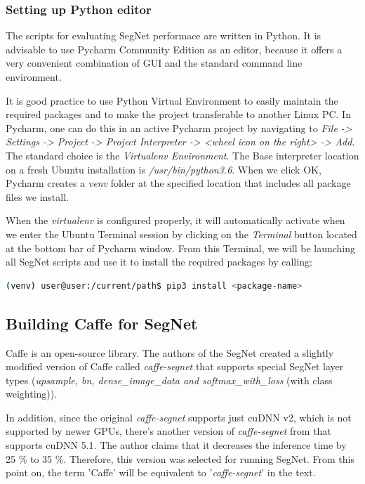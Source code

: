 \subsubsection{Setting up Python editor}

The scripts for evaluating SegNet performace are written in Python. It is advisable to use Pycharm Community Edition as an editor, because it offers a very convenient combination of GUI and the standard command line environment.

It is good practice to use Python Virtual Environment to easily maintain the required packages and to make the project transferable to another Linux PC. In Pycharm, one can do this in an active Pycharm project by navigating to \textit{File -> Settings -> Project -> Project Interpreter -> <wheel icon on the right> -> Add}. The standard choice is the \textit{Virtualenv Environment}. The Base interpreter location on a fresh Ubuntu installation is \textit{/usr/bin/python3.6}. When we click OK, Pycharm creates a \textit{venv} folder at the specified location that includes all package files we install.

When the \textit{virtualenv} is configured properly, it will automatically activate when we enter the Ubuntu Terminal session by clicking on the \textit{Terminal} button located at the bottom bar of Pycharm window. From this Terminal, we will be launching all SegNet scripts and use it to install the required packages by calling:

\begin{lstlisting}[language=bash]
(venv) user@user:/current/path$ pip3 install <package-name>
\end{lstlisting}

\subsection{Building Caffe for SegNet} 

Caffe is an open-source library. The authors of the SegNet created a slightly modified version of Caffe called \textit{caffe-segnet} that supports special SegNet layer types (\textit{upsample, bn, dense\_image\_data and softmax\_with\_loss} (with class weighting)).

In addition, since the original \textit{caffe-segnet} supports just cuDNN v2, which is not supported by newer GPUs, there's another version of \textit{caffe-segnet} from \cite{filip_github_caffe} that supports cuDNN 5.1. The author claims that it decreases the inference time by 25 \% to 35 \%. Therefore, this version was selected for running SegNet. From this point on, the term 'Caffe' will be equivalent to '\textit{caffe-segnet}' in the text.

